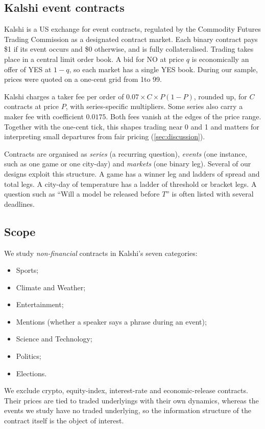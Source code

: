 \subsection{Kalshi event contracts}

Kalshi is a US exchange for event contracts, regulated by the Commodity Futures Trading Commission
as a designated contract market. Each binary contract pays \$1 if its event occurs and \$0
otherwise, and is fully collateralised. Trading takes place in a central limit order book. A bid
for NO at price $q$ is economically an offer of YES at $1-q$, so each market has a single YES book.
During our sample, prices were quoted on a one-cent grid from 1\cents to 99\cents.

Kalshi charges a taker fee per order of $0.07\times C\times P(1-P)$, rounded up, for $C$ contracts at
price $P$, with series-specific multipliers. Some series also carry a maker fee with coefficient
$0.0175$. Both fees vanish at the edges of the price range. Together with the one-cent tick, this
shapes trading near 0 and 1 and matters for interpreting small departures from fair pricing
(\cref{sec:discussion}).

Contracts are organised as \emph{series} (a recurring question), \emph{events} (one instance, such
as one game or one city-day) and \emph{markets} (one binary leg). Several of our designs exploit
this structure. A game has a winner leg and ladders of spread and total legs. A city-day of
temperature has a ladder of threshold or bracket legs. A question such as ``Will a model be
released before $T$'' is often listed with several deadlines.

\subsection{Scope}

We study \emph{non-financial} contracts in Kalshi's seven categories:
\begin{itemize}
  \item Sports;
  \item Climate and Weather;
  \item Entertainment;
  \item Mentions (whether a speaker says a phrase during an event);
  \item Science and Technology;
  \item Politics;
  \item Elections.
\end{itemize}
We exclude crypto, equity-index, interest-rate and economic-release contracts. Their prices are
tied to traded underlyings with their own dynamics, whereas the events we study have no traded
underlying, so the information structure of the contract itself is the object of interest.


